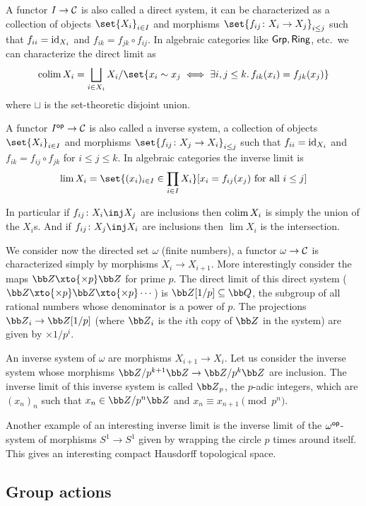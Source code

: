     A functor $I\to{{\cal C}}$ is also called a {\emphcolor direct system}, it can be characterized as a collection of objects $\set{X_i}_{i\in I}$ and morphisms $\set{f_{ij}\colon X_i\to X_j}_{i\leq j}$ such that
    $f_{ii}={\rm id}_{X_i}$ and $f_{ik}=f_{jk}\circ f_{ij}$.
    In algebraic categories like ${\sf Grp},{\sf Ring}$, etc.\ we can characterize the direct limit as
    $$ \colim X_i = \bigsqcup_{i\in X_i}X_i/\set{x_i\sim x_j\iff\exists i,j\leq k.\,f_{ik}(x_i)=f_{jk}(x_j)} $$
    where $\sqcup$ is the set-theoretic disjoint union.

    A functor $I^{\sf op}\to{{\cal C}}$ is also called a {\emphcolor inverse system}, a collection of objects $\set{X_i}_{i\in I}$ and morphisms $\set{f_{ij}\colon X_j\to X_i}_{i\leq j}$ such that
    $f_{ii}={\rm id}_{X_i}$ and $f_{ik}=f_{ij}\circ f_{jk}$ for $i\leq j\leq k$.
    In algebraic categories the inverse limit is
    $$ \lim X_i = \set{(x_i)_{i\in I}\in\prod_{i\in I}X_i}[x_i=f_{ij}(x_j)\hbox{ for all $i\leq j$}] $$

    In particular if $f_{ij}\colon X_i\inj X_j$ are inclusions then $\mathop{\rm colim}\nolimits X_i$ is simply the union of the $X_i$s.
    And if $f_{ij}\colon X_j\inj X_i$ are inclusions then $\lim X_i$ is the intersection.

    We consider now the directed set $\omega$ (finite numbers), a functor $\omega\to{{\cal C}}$ is characterized simply by morphisms $X_i\to X_{i+1}$.
    More interestingly consider the maps $\bZ\xto{\times p}\bZ$ for prime $p$.
    The direct limit of this direct system ($\bZ\xto{\times p}\bZ\xto{\times p}\cdots$) is $\bZ[1/p]\subseteq\bQ$, the subgroup of all rational numbers whose denominator is a power of $p$.
    The projections $\bZ_i\to\bZ[1/p]$ (where $\bZ_i$ is the $i$th copy of $\bZ$ in the system) are given by $\times1/p^i$.

    An inverse system of $\omega$ are morphisms $X_{i+1}\to X_i$.
    Let us consider the inverse system whose morphisms $\bZ/p^{k+1}\bZ\to\bZ/p^k\bZ$ are inclusion.
    The inverse limit of this inverse system is called $\bZ_p$, the {\emphcolor $p$-adic integers}, which are $(x_n)_n$ such that $x_n\in\bZ/p^n\bZ$ and $x_n\equiv x_{n+1}\pmod{p^n}$.

    Another example of an interesting inverse limit is the inverse limit of the $\omega^{\sf op}$-system of morphisms $S^1\to S^1$ given by wrapping the circle $p$ times around itself.
    This gives an interesting compact Hausdorff topological space.

\eexam

\subsection{Group actions}

